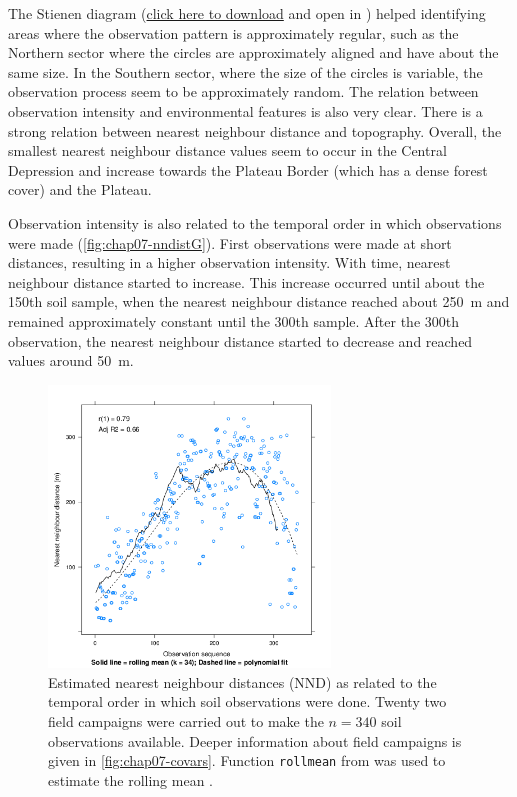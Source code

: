 The Stienen diagram (\href{https://drive.google.com/file/d/0B7xsLbrOA23oeG9zSWVLcnZYdEk/edit?usp=sharing}{click
here to download} and open in \googleearth) helped identifying areas where the observation pattern is 
approximately regular, such as the Northern sector where the circles are approximately aligned and have about 
the same size. In the Southern sector, where the size of the circles is variable, the observation process seem 
to be approximately random. The relation between observation intensity and environmental features is also very 
clear. There is a strong relation between nearest neighbour distance and topography. Overall, the smallest 
nearest neighbour distance values seem to occur in the Central Depression and increase towards the Plateau 
Border (which has a dense forest cover) and the Plateau.

Observation intensity is also related to the temporal order in which observations were made 
(\autoref{fig:chap07-nndistG}). First observations were made at short distances, resulting in a higher 
observation intensity. With time, nearest neighbour distance started to increase. This increase occurred until 
about the \num{150}th soil sample, when the nearest neighbour distance reached about \SI{250}{\m} and 
remained approximately constant until the \num{300}th sample. After the \num{300}th observation, the 
nearest neighbour distance started to decrease and reached values around \SI{50}{\m}.

\begin{figure}[!ht]
 \centering
 \includegraphics[trim=0mm 0mm 0mm 12mm,clip=true,width=7.5cm]{fig/chap07-nndistG}

 \caption{Estimated nearest neighbour distances (NND) as related to the temporal order in which soil 
observations 
 were done. Twenty two field campaigns were carried out to make the $n = 340$ soil observations available.
 Deeper information about field campaigns is given in \autoref{fig:chap07-covars}. Function \texttt{rollmean} 
 from  was used to estimate the rolling mean \cite{ZeileisEtAl2005}.}
 \label{fig:chap07-nndistG}
\end{figure}

